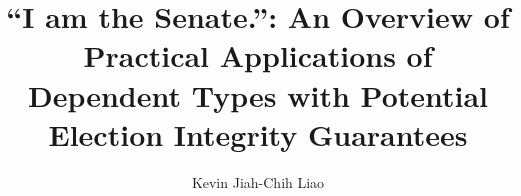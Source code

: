 \documentclass[a4paper,12pt,twoside]{report}
\begin{document}
\title{\LARGE {\bf ``I am the Senate.'': An Overview of Practical Applications of Dependent Types with Potential Election Integrity Guarantees}\\
 \vspace*{6mm}
}

\author{Kevin Jiah-Chih Liao}

\normallinespacing
\maketitle

\preface
% 
% 
% 
% 

\body

% 


% 

\appendix




\end{document}
